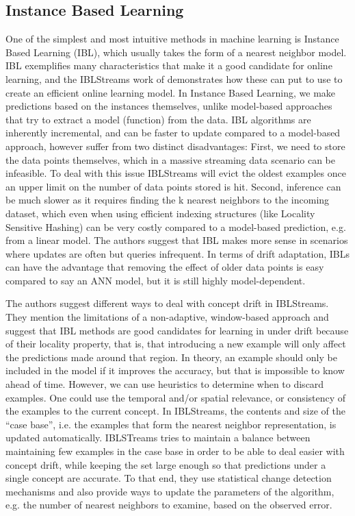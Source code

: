 \subsection*{Instance Based Learning}
One of the simplest and most intuitive methods in machine learning
is Instance Based Learning (IBL), which usually takes the form of
a nearest neighbor model. IBL exemplifies many characteristics
that make it a good candidate for online learning, and the
IBLStreams work of \citet{ibl-streams} demonstrates how these
can put to use to create an efficient online learning model.
In Instance Based Learning, we make predictions based on the instances themselves, unlike
model-based approaches that try to extract a model (function) from the
data. IBL algorithms are inherently incremental, and can be faster to
update compared to a model-based approach, however suffer from two
distinct disadvantages: First, we need to store the data points themselves, which in a
massive streaming data scenario can be infeasible. To deal with this
issue IBLStreams will evict the oldest examples once an upper limit on
the number of data points stored is hit. Second, inference can be much slower as it requires
finding the k nearest neighbors to the incoming dataset, which even when
using efficient indexing structures (like Locality Sensitive Hashing\cite{lsh-indyk, lsh-gionis}) can be very costly
compared to a model-based prediction, e.g. from a linear model. The
authors suggest that IBL makes more sense in scenarios where updates are
often but queries infrequent. In terms of drift adaptation, IBLs can have
the advantage that removing the effect of older data points is easy
compared to say an ANN model, but it is still highly model-dependent.

The authors suggest different ways to deal with
concept drift in IBLStreams. They mention the limitations of a non-adaptive, window-based
approach and suggest that IBL methods are good candidates for learning in
under drift because of their locality property, that is, that introducing
a new example will only affect the predictions made around that region.
In theory, an example should only be included in the model if it improves the
accuracy, but that is impossible to know ahead of time. However, we can use heuristics
to determine when to discard examples. One could use the temporal and/or spatial
relevance, or consistency of the examples to the current concept.
In IBLStreams, the contents and size of the ``case base'',
i.e. the examples that form the nearest neighbor representation, is
updated automatically. IBLSTreams tries to maintain a balance between
maintaining few examples in the case base in order to be able to deal
easier with concept drift, while keeping the set large enough so that
predictions under a single concept are accurate. To that end, they
use statistical change detection mechanisms and also provide ways
to update the parameters of the algorithm, e.g. the number of nearest
neighbors to examine, based on the observed error.

